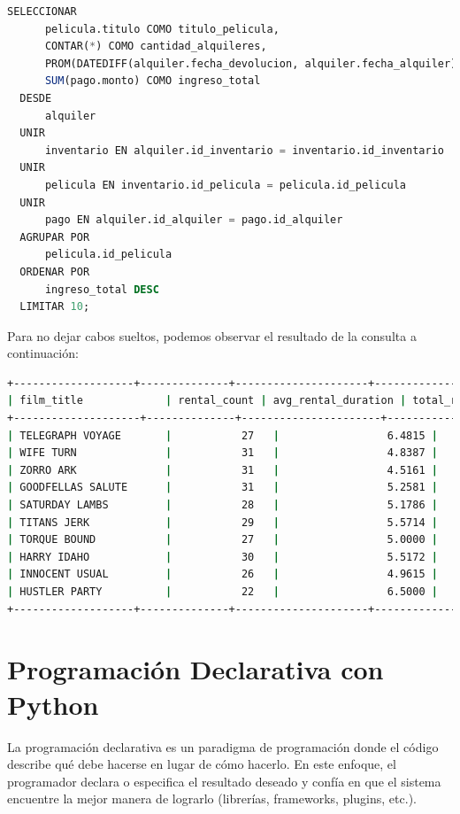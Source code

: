 \documentclass[12pt]{article}
\begin{document}
\begin{lstlisting}[language=SQL]
  SELECCIONAR
      pelicula.titulo COMO titulo_pelicula,
      CONTAR(*) COMO cantidad_alquileres,
      PROM(DATEDIFF(alquiler.fecha_devolucion, alquiler.fecha_alquiler)) COMO duracion_promedio_alquiler,
      SUM(pago.monto) COMO ingreso_total
  DESDE
      alquiler
  UNIR
      inventario EN alquiler.id_inventario = inventario.id_inventario
  UNIR
      pelicula EN inventario.id_pelicula = pelicula.id_pelicula
  UNIR
      pago EN alquiler.id_alquiler = pago.id_alquiler
  AGRUPAR POR
      pelicula.id_pelicula
  ORDENAR POR
      ingreso_total DESC
  LIMITAR 10;

\end{lstlisting}
\vspace{12pt}
\newpage
Para no dejar cabos sueltos, podemos observar el resultado de la consulta a continuación:

\begin{lstlisting}[language=Bash]
  +-------------------+--------------+---------------------+---------------+
| film_title             | rental_count | avg_rental_duration | total_revenue   |
+--------------------+--------------+----------------------+---------------+
| TELEGRAPH VOYAGE       |           27   |                 6.4815 |            231.73 |
| WIFE TURN              |           31   |                 4.8387 |            223.69 |
| ZORRO ARK              |           31   |                 4.5161 |            214.69 |
| GOODFELLAS SALUTE      |           31   |                 5.2581 |            209.69 |
| SATURDAY LAMBS         |           28   |                 5.1786 |            204.72 |
| TITANS JERK            |           29   |                 5.5714 |            201.71 |
| TORQUE BOUND           |           27   |                 5.0000 |            198.72 |
| HARRY IDAHO            |           30   |                 5.5172 |            195.70 |
| INNOCENT USUAL         |           26   |                 4.9615 |            191.74 |
| HUSTLER PARTY          |           22   |                 6.5000 |            190.78 |
+-------------------+--------------+---------------------+---------------+
\end{lstlisting}
\vspace{12pt}

\section{Programación Declarativa con Python}
La programación declarativa es un paradigma de programación donde el código describe qué debe hacerse en lugar de cómo hacerlo. En este enfoque, el programador declara o especifica el resultado deseado y confía en que el sistema encuentre la mejor manera de lograrlo (librerías, frameworks, plugins, etc.).
\end{document}
